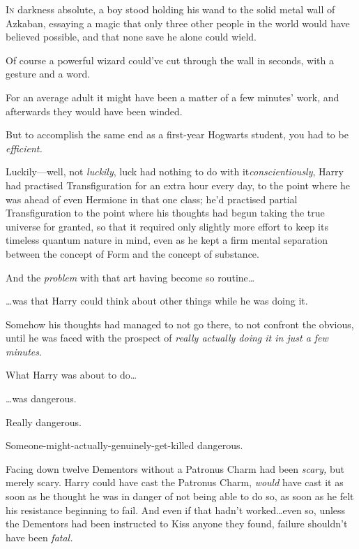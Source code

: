 
\lettrine{I}{n} darkness absolute, a boy stood holding his wand to the solid metal wall of Azkaban, essaying a magic that only three other people in the world would have believed possible, and that none save he alone could wield.

Of course a powerful wizard could’ve cut through the wall in seconds, with a gesture and a word.

For an average adult it might have been a matter of a few minutes’ work, and afterwards they would have been winded.

But to accomplish the same end as a first-year Hogwarts student, you had to be \emph{efficient.}

Luckily—well, not \emph{luckily}, luck had nothing to do with
it\emdashhyp\emph{conscientiously}, Harry had practised Transfiguration for an extra hour every day, to the point where he was ahead of even Hermione in that one class; he’d practised partial Transfiguration to the point where his thoughts had begun taking the true universe for granted, so that it required only slightly more effort to keep its timeless quantum nature in mind, even as he kept a firm mental separation between the concept of Form and the concept of substance.

And the \emph{problem} with that art having become so routine…

…was that Harry could think about other things while he was doing it.

Somehow his thoughts had managed to not go there, to not confront the obvious, until he was faced with the prospect of \emph{really actually doing it in just a few minutes}.

What Harry was about to do…

…was dangerous.

Really dangerous.

Someone-might-actually-genuinely-get-killed dangerous.

Facing down twelve Dementors without a Patronus Charm had been \emph{scary,} but merely scary. Harry could have cast the Patronus Charm, \emph{would} have cast it as soon as he thought he was in danger of not being able to do so, as soon as he felt his resistance beginning to fail. And even if that hadn’t worked…even so, unless the Dementors had been instructed to Kiss anyone they found, failure shouldn’t have been \emph{fatal.}


